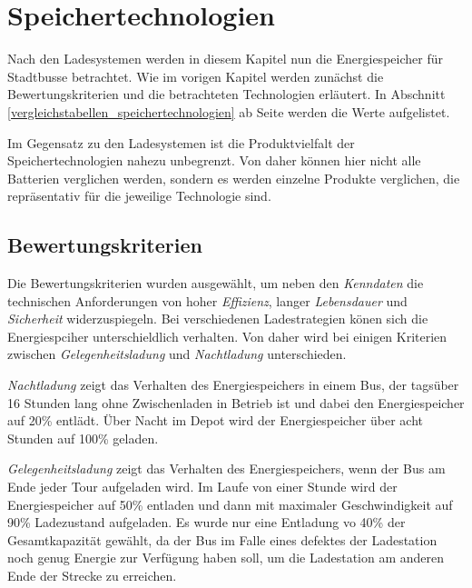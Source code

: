 \chapter{Speichertechnologien}

Nach den Ladesystemen werden in diesem Kapitel nun die Energiespeicher für Stadtbusse betrachtet. Wie im vorigen Kapitel werden zunächst die Bewertungskriterien und die betrachteten Technologien erläutert. In Abschnitt \ref{vergleichstabellen_speichertechnologien} ab Seite \pageref{vergleichstabellen_speichertechnologien} werden die Werte aufgelistet.

Im Gegensatz zu den Ladesystemen ist die Produktvielfalt der Speichertechnologien nahezu unbegrenzt. Von daher können hier nicht alle Batterien verglichen werden, sondern es werden einzelne Produkte verglichen, die repräsentativ für die jeweilige Technologie sind.

\section{Bewertungskriterien}
Die Bewertungskriterien wurden ausgewählt, um neben den \emph{Kenndaten} die technischen Anforderungen von hoher \emph{Effizienz}, langer \emph{Lebensdauer} und \emph{Sicherheit} widerzuspiegeln. Bei verschiedenen Ladestrategien könen sich die Energiespciher unterschieldlich verhalten. Von daher wird bei einigen Kriterien zwischen \emph{Gelegenheitsladung} und \emph{Nachtladung} unterschieden.

\emph{Nachtladung} zeigt das Verhalten des Energiespeichers in einem Bus, der tagsüber 16 Stunden lang ohne Zwischenladen in Betrieb ist und dabei den Energiespeicher auf 20\% entlädt. Über Nacht im Depot wird der Energiespeicher über acht Stunden auf 100\% geladen.

\emph{Gelegenheitsladung} zeigt das Verhalten des Energiespeichers, wenn der Bus am Ende jeder Tour aufgeladen wird. Im Laufe von einer Stunde wird der Energiespeicher auf 50\% entladen und dann mit maximaler Geschwindigkeit auf 90\% Ladezustand aufgeladen. Es wurde nur eine Entladung vo 40\% der Gesamtkapazität gewählt, da der Bus im Falle eines defektes der Ladestation noch genug Energie zur Verfügung haben soll, um die Ladestation am anderen Ende der Strecke zu erreichen.

